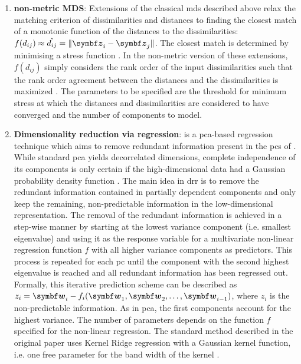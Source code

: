 \begin{enumerate}
\item\textbf{non-metric MDS}: Extensions of the classical \gls{mds} described above relax the matching criterion of dissimilarities and distances to finding the closest match of a monotonic function of the distances to the dissimilarities: \(f(d_{ij}) \approx \hat{d_{ij}} = \lVert \matsub{z}{i} - \matsub{z}{j}\rVert \). The closest match is determined by minimising a stress function \citep{Kruskal1964a,Kruskal1964b}. In the non-metric version of these extensions, \(f(d_{ij})\) simply considers the rank order of the input dissimilarities such that the rank order agreement between the distances and the dissimilarities is maximized \citep{Minchin1987}. The parameters to be specified are the threshold for minimum stress at which the distances and dissimilarities are considered to have converged and the number of components to model.

\item\textbf{Dimensionality reduction via regression}:  is a \gls{pca}-based regression technique which aims to remove redundant information present in the \glspl{pc}  of . While standard \gls{pca} yields decorrelated dimensions, complete independence of its components is only certain if the high-dimensional data had a Gaussian probability density function \citep{Laparra2015}. The main idea in \gls{drr} is to remove the redundant information contained in partially dependent components and only keep the remaining, non-predictable information in the low-dimensional representation. The removal of the redundant information is achieved in a step-wise manner by starting at the lowest variance component (i.e. smallest eigenvalue) and using it as the response variable for a multivariate non-linear regression function \(f\) with all higher variance components as predictors. This process is repeated for each \gls{pc} until the component with the second highest eigenvalue is reached and all redundant information has been regressed out.  Formally, this iterative prediction scheme can be described as \(z_i = \mat{w}_{i} - f_i(\mat{w}_{1},\mat{w}_{2}, \dots ,\allowbreak \mat{w}_{ i-1})\), where \(z_i\) is the non-predictable information. As in \gls{pca}, the first components account for the highest variance. The number of parameters depends on the function \(f\) specified for the non-linear regression. The standard method described in the original paper uses Kernel Ridge regression with a Gaussian kernel function, i.e. one free parameter for the band width of the kernel \citep{Laparra2015}. 


\end{enumerate}
